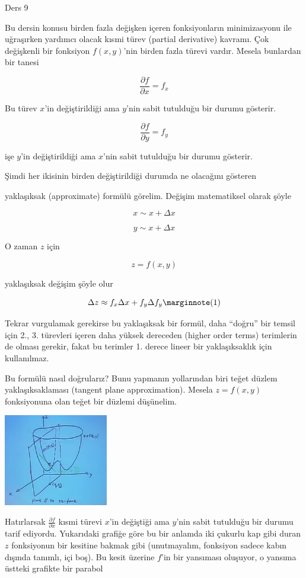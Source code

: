 \documentclass[12pt,fleqn]{article}\usepackage{../../common}
\begin{document}
Ders 9

Bu dersin konusu birden fazla değişken içeren fonksiyonların minimizasyonu ile
uğraşırken yardımcı olacak kısmi türev (partial derivative) kavramı. Çok
değişkenli bir fonksiyon $f(x,y)$'nin birden fazla türevi vardır. Mesela
bunlardan bir tanesi

$$ \frac{\partial f}{\partial x} = f_x $$

Bu türev $x$'in değiştirildiği ama $y$'nin sabit tutulduğu bir durumu
gösterir. 

$$ \frac{\partial f}{\partial y} = f_y $$

işe $y$'in değiştirildiği ama $x$'nin sabit tutulduğu bir durumu gösterir.

Şimdi her ikisinin birden değiştirildiği durumda ne olacağını gösteren

yaklaşıksak (approximate) formülü görelim. Değişim matematiksel olarak
şöyle

$$ x \sim x + \Delta x $$

$$ y \sim x + \Delta x $$

O zaman $z$ için

$$ z = f(x,y) $$

yaklaşıksak değişim şöyle olur

$$
\Delta z \approx f_x\Delta x + f_y \Delta f_y
\mlabel{1}
$$


Tekrar vurgulamak gerekirse bu yaklaşıksak bir formül, daha ``doğru'' bir
temsil için 2., 3. türevleri içeren daha yüksek dereceden (higher order
terms) terimlerin de olması gerekir, fakat bu terimler 1. derece lineer bir
yaklaşıksaklık için kullanılmaz.

Bu formülü nasıl doğrularız? Bunu yapmanın yollarından biri teğet düzlem
yaklaşıksaklaması (tangent plane approximation). Mesela $z = f(x,y)$
fonksiyonuna olan teğet bir düzlemi düşünelim.

\begin{center}
\includegraphics[height=4cm]{9_1.png}
\end{center}

Hatırlarsak $\frac{\partial f}{\partial x}$ kısmi türevi $x$'in değiştiği ama
$y$'nin sabit tutulduğu bir durumu tarif ediyordu. Yukarıdaki grafiğe göre bu
bir anlamda iki çukurlu kap gibi duran $z$ fonksiyonun bir kesitine bakmak gibi
(unutmayalım, fonksiyon sadece kabın dışında tanımlı, içi boş). Bu kesit üzerine
$f$'in bir yansıması oluşuyor, o yansıma üstteki grafikte bir parabol
\end{document}
